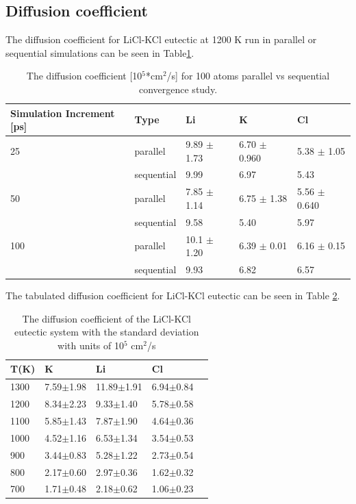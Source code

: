 \documentclass[review]{elsarticle}
\begin{document}
\subsection{Diffusion coefficient}
The diffusion coefficient for LiCl-KCl eutectic at 1200 K run in parallel or sequential simulations can be seen in Table\ref{Table:parVSseq}.

\begin{table}[h]
\centering
\caption{The diffusion coefficient [10$^5$*cm$^2$/s] for 100 atoms parallel vs sequential convergence study. }
\begin{tabular}{lllll}
\hline
Simulation Increment   {[}ps{]} & Type       & Li       & K        & Cl       \\
\hline
25                              & parallel   & 9.89 $\pm$ 1.73& 6.70 $\pm$ 0.960& 5.38 $\pm$ 1.05\\
& sequential & 9.99 & 6.97 & 5.43 \\
50 & parallel   & 7.85  $\pm$ 1.14& 6.75 $\pm$ 1.38& 5.56 $\pm$  0.640\\
 & sequential & 9.58 & 5.40 & 5.97 \\
100 & parallel   & 10.1  $\pm$ 1.20& 6.39 $\pm$  0.01 & 6.16 $\pm$  0.15\\
& sequential & 9.93 & 6.82 & 6.57 \\
\hline
\end{tabular}
\label{Table:parVSseq}
\end{table}
\FloatBarrier

The tabulated diffusion coefficient for LiCl-KCl eutectic can be seen in Table \ref{Table: licl-kcl-eut diffusion}.

\begin{table}[h]
\centering
\caption{The diffusion coefficient of the LiCl-KCl eutectic system with the standard deviation with units of 10$^5$ cm$^2$/s }
\begin{tabular}{lllll}
\hline
T(K) & K           & Li          & Cl          &  \\
\hline
1300 & 7.59$\pm$1.98 & 11.89$\pm$1.91 & 6.94$\pm$0.84 &  \\
1200 & 8.34$\pm$2.23 & 9.33$\pm$1.40  & 5.78$\pm$0.58 &  \\
1100 & 5.85$\pm$1.43 & 7.87$\pm$1.90  & 4.64$\pm$0.36 &  \\
1000 & 4.52$\pm$1.16 & 6.53$\pm$1.34  & 3.54$\pm$0.53 &  \\
900  & 3.44$\pm$0.83 & 5.28$\pm$1.22  & 2.73$\pm$0.54 &  \\
800  & 2.17$\pm$0.60 & 2.97$\pm$0.36  & 1.62$\pm$0.32 &  \\
700  & 1.71$\pm$0.48 & 2.18$\pm$0.62  & 1.06$\pm$0.23  \\
\hline
\end{tabular}
\label{Table: licl-kcl-eut diffusion}
\end{table}
\FloatBarrier
\end{document}
